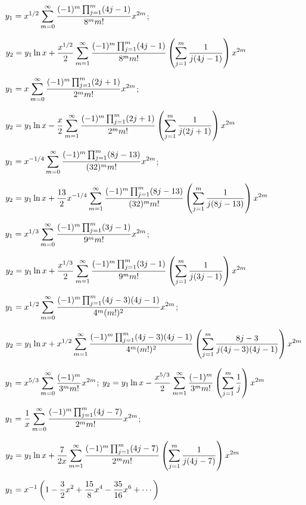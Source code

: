 $\displaystyle{y_{1}=x^{1/2}\sum_{m=0}^{\infty}\frac{(-1)^{m}\prod_{j=1}^{m}(4j-1)}{8^{m}m!}
x^{2m}}$;\;

\quad\;  \;\;\;
$\displaystyle{y_{2}=y_{1}\ln
x+\frac{x^{1/2}}{2}\sum_{m=1}^{\infty}\frac{(-1)^{m}\prod_{j=1}^{m}(4j-1)}{8^{m}m!}
\left(\sum_{j=1}^{m}\frac{1}{j(4j-1)}\right)x^{2m}}$

$\displaystyle{y_{1}=x\sum_{m=0}^{\infty}\frac{(-1)^{m}\prod_{j=1}^{m}(2j+1)}{2^{m}m!}
x^{2m}}$;\;

\quad\;  \;\;\;
$\displaystyle{y_{2}=y_{1}\ln
x-\frac{x}{2}\sum_{m=1}^{\infty}\frac{(-1)^{m}\prod_{j=1}^{m}(2j+1)}{2^{m}m!}
\left(\sum_{j=1}^{m}\frac{1}{j(2j+1)}\right)x^{2m}}$

$\displaystyle{y_{1}=x^{-1/4}\sum_{m=0}^{\infty}\frac{(-1)^{m}\prod_{j=1}^{m}(8j-13)}{(32)^{m}m!}
x^{2m}}$;\;

\quad\;  \;\;\;
$\displaystyle{y_{2}=y_{1}\ln
x+\frac{13}{2}x^{-1/4}\sum_{m=1}^{\infty}\frac{(-1)^{m}\prod_{j=1}^{m}(8j-13)}{(32)^{m}m!}
\left(\sum_{j=1}^{m}\frac{1}{j(8j-13)}\right)x^{2m}}$

$\displaystyle{y_{1}=x^{1/3}\sum_{m=0}^{\infty}\frac{(-1)^{m}\prod_{j=1}^{m}(3j-1)}{9^{m}m!}
x^{2m}}$;\;

\quad\;  \;\;\;
$\displaystyle{y_{2}=y_{1}\ln
x+\frac{x^{1/3}}{2}\sum_{m=1}^{\infty}\frac{(-1)^{m}\prod_{j=1}^{m}(3j-1)}{9^{m}m!}
\left(\sum_{j=1}^{m}\frac{1}{j(3j-1)}\right)x^{2m}}$

$\displaystyle{y_{1}=x^{1/2}\sum_{m=0}^{\infty}\frac{(-1)^{m}\prod_{j=1}^{m}(4j-3)(4j-1)}{4^{m}(m!)^{2}}
x^{2m}}$;\;

\quad\;  \;\;\;
$\displaystyle{y_{2}=y_{1}\ln
x+x^{1/2}\sum_{m=1}^{\infty}\frac{(-1)^{m}\prod_{j=1}^{m}(4j-3)(4j-1)}{4^{m}(m!)^{2}}
\left(\sum_{j=1}^{m}\frac{8j-3}{j(4j-3)(4j-1)}\right)x^{2m}}$

$\displaystyle{y_{1}=x^{5/3}\sum_{m=0}^{\infty}\frac{(-1)^{m}}{3^{m}m!}x^{2m}}$;\;
$\displaystyle{y_{2}=y_{1}\ln
x-\frac{x^{5/3}}{2}\sum_{m=1}^{\infty}\frac{(-1)^{m}}{3^{m}m!}\left(\sum_{j=1}^{m}\frac{1}{j}\right)x^{2m}}$\;

$\displaystyle{y_{1}=\frac{1}{x}\sum_{m=0}^{\infty}\frac{(-1)^{m}\prod_{j=1}^{m}(4j-7)}{2^{m}m!}x^{2m}}$;\;

\quad\;  \;\;\;
$\displaystyle{y_{2}=y_{1}\ln
x+\frac{7}{2x}\sum_{m=1}^{\infty}\frac{(-1)^{m}\prod_{j=1}^{m}(4j-7)}{2^{m}m!}
\left(\sum_{j=1}^{m}\frac{1}{j(4j-7)}\right)x^{2m}}$

$\displaystyle{y_{1}=x^{-1}\left(1-\frac{3}{2}x^{2}+\frac{15}{8}x^{4}-\frac{35}{16}x^{6}+\cdots\right)}$

